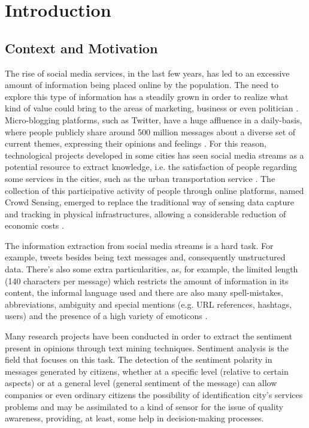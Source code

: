 \chapter{Introduction} \label{chap:intro}

\section*{}

\section{Context and Motivation} \label{sec:context}
The rise of social media services, in the last few years, has led to an excessive amount of information being placed online by the population. The need to explore this type of information has a steadily grown in order to realize what kind of value could bring to the areas of marketing, business or even politician \cite{kn:Feldman:2013}. Micro-blogging platforms, such as Twitter, have a huge affluence in a daily-basis, where people publicly share around 500 million messages about a diverse set of current themes, expressing their opinions and feelings \cite{kn:Giachanou2016}. For this reason, technological projects developed in some cities has seen social media streams as a potential resource to extract knowledge, i.e. the satisfaction of people regarding some services in the cities, such as the urban transportation service \cite{kn:Anastasi2013}. The collection of this participative activity of people through online platforms, named Crowd Sensing, emerged to replace the traditional way of sensing data capture and tracking in physical infrastructures, allowing a considerable reduction of economic costs \cite{kn:Szabo2013}.

The information extraction from social media streams is a hard task. For example, tweets besides being text messages and, consequently unstructured data. There's also some extra particularities, as, for example, the limited length (140 characters per message) which restricts the amount of information in its content, the informal language used and there are also many spell-mistakes, abbreviations, ambiguity and special mentions (e.g. URL references, hashtags, users) and the presence of a high variety of emoticons \cite{kn:Musto2015}.

Many research projects have been conducted in order to extract the sentiment present in opinions through text mining techniques. Sentiment analysis is the field that focuses on this task. The detection of the sentiment polarity in messages generated by citizens, whether at a specific level (relative to certain aspects) or at a general level (general sentiment of the message) can allow companies or even ordinary citizens the possibility of identification city's services problems and may be assimilated to a kind of sensor for the issue of quality awareness, providing, at least, some help in decision-making processes.

